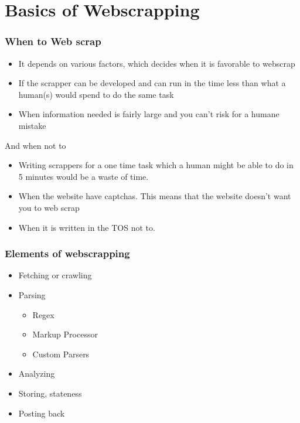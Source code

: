 \documentclass{beamer}
\begin{document}
\section{Basics of Webscrapping}
\label{sec-2}
\begin{frame}
\frametitle{When to Web scrap}
\label{sec-2_1}


\begin{itemize}
\item It depends on various factors, which decides when it is favorable to webscrap
\item If the scrapper can be developed and can run in the time less than what a human(s) would spend to do the same task
\item When information needed is fairly large and you can't risk for a humane mistake
\end{itemize}
   And when not to

\begin{itemize}
\item Writing scrappers for a one time task which a human might be able to do in 5 minutes would be a waste of time.
\item When the website have captchas. This means that the website doesn't want you to web scrap
\item When it is written in the TOS not to.
\end{itemize}
\end{frame}
\begin{frame}
\frametitle{Elements of webscrapping}
\label{sec-2_2}


\begin{itemize}
\item Fetching or crawling
\item Parsing
\begin{itemize}
\item Regex
\item Markup Processor
\item Custom Parsers
\end{itemize}
\item Analyzing
\item Storing, stateness
\item Posting back
\end{itemize}
\end{frame}
\end{document}
